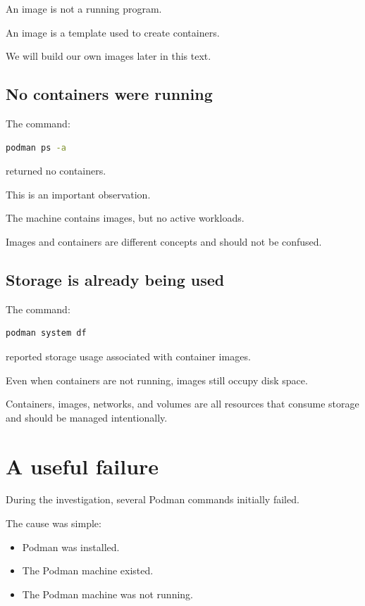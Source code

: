 An image is not a running program.

An image is a template used to create containers.

We will build our own images later in this text.

\subsection{No containers were running}

The command:

\begin{lstlisting}[language=bash]
podman ps -a
\end{lstlisting}

returned no containers.

This is an important observation.

The machine contains images, but no active workloads.

Images and containers are different concepts and should not be confused.

\subsection{Storage is already being used}

The command:

\begin{lstlisting}[language=bash]
podman system df
\end{lstlisting}

reported storage usage associated with container images.

Even when containers are not running, images still occupy disk space.

Containers, images, networks, and volumes are all resources that consume storage and should be managed intentionally.

\section{A useful failure}

During the investigation, several Podman commands initially failed.

The cause was simple:

\begin{itemize}
  \item Podman was installed.
  \item The Podman machine existed.
  \item The Podman machine was not running.
\end{itemize}

